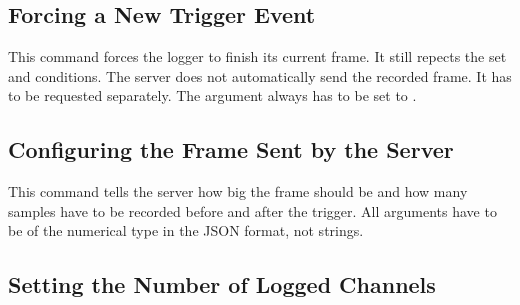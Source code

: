 \subsection{Forcing a New Trigger Event} %
\label{subsec:devguide:server:forcing_trigger}

This  command  forces  the  logger  to  finish  its  current  frame. It  still
repects the  set   and  conditions.   The server  does not
automatically send the recorded frame. It has to be requested separately.  The
argument  always has to be set to .


\subsection{Configuring the Frame Sent by the Server } %
\label{subsec:devguide:server:config_frame}

This command tells the server how big the frame should be and how many samples
have to be recorded before and after  the trigger. All arguments have to be of
the numerical type in the JSON format, not strings.


\subsection{Setting the Number of Logged Channels} %
\label{subsec:devguide:server:no_of_logged_channels}

